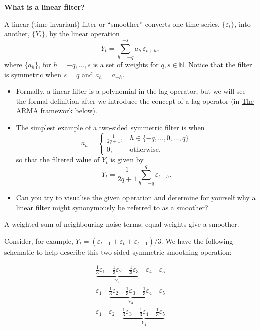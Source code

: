 \documentclass[
  letterpaper,
  DIV=11,
  numbers=noendperiod]{scrartcl}
\newcommand{\slidelabel}[1]{{\color{embernavy}\bfseries\large #1\par\vspace{5pt}}}
\newenvironment{slidefooter}{%
  \par\vspace{7pt}{\color{emberrule}\rule{\linewidth}{0.4pt}}\par\vspace{4pt}%
  \color{emberamber}\itshape\small}{\par}
\begin{document}
\begin{slidebox}

\slidelabel{What is a linear filter?}

A linear (time-invariant) filter or ``smoother'' converts one time
series, \(\{\varepsilon_t\}\), into another, \(\{Y_t\}\), by the linear
operation \[Y_t = \sum_{h=-q}^{+s} a_h\,\varepsilon_{t+h},\] where
\(\{a_h\}\), for \(h = -q, \ldots, s\) is a set of weights for
\(q, s \in \mathbb{N}\). Notice that the filter is symmetric when
\(s = q\) and \(a_h = a_{-h}\).

\begin{itemize}
\item
  Formally, a linear filter is a polynomial in the lag operator, but we
  will see the formal definition after we introduce the concept of a lag
  operator (in \hyperref[the-arma-framework]{The ARMA framework} below).
\item
  The simplest example of a two-sided symmetric filter is when
  \[a_h = \begin{cases} \frac{1}{2q+1}, & h \in \{-q, \ldots, 0, \ldots, q\} \\ 0, & \text{otherwise}, \end{cases}\]
  so that the filtered value of \(Y_t\) is given by
  \[Y_t = \frac{1}{2q+1}\sum_{h=-q}^{q}\varepsilon_{t+h}.\]
\item
  Can you try to visualise the given operation and determine for
  yourself why a linear filter might synonymously be referred to as a
  smoother?
\end{itemize}

\begin{slidefooter}

A weighted sum of neighbouring noise terms; equal weights give a
smoother.

\end{slidefooter}

\end{slidebox}

Consider, for example,
\(Y_t = (\varepsilon_{t-1} + \varepsilon_t + \varepsilon_{t+1})/3\). We
have the following schematic to help describe this two-sided symmetric
smoothing operation:

\[\begin{aligned} \underset{Y_2}{\underbrace{\tfrac{1}{3}\varepsilon_1 \quad \tfrac{1}{3}\varepsilon_2 \quad \tfrac{1}{3}\varepsilon_3}} \quad \varepsilon_4 \quad \varepsilon_5 \\ \varepsilon_1 \quad \underset{Y_3}{\underbrace{\tfrac{1}{3}\varepsilon_2 \quad \tfrac{1}{3}\varepsilon_3 \quad \tfrac{1}{3}\varepsilon_4}} \quad \varepsilon_5 \\ \varepsilon_1 \quad \varepsilon_2 \quad \underset{Y_4}{\underbrace{\tfrac{1}{3}\varepsilon_3 \quad \tfrac{1}{3}\varepsilon_4 \quad \tfrac{1}{3}\varepsilon_5}} \end{aligned}\]
\end{document}
